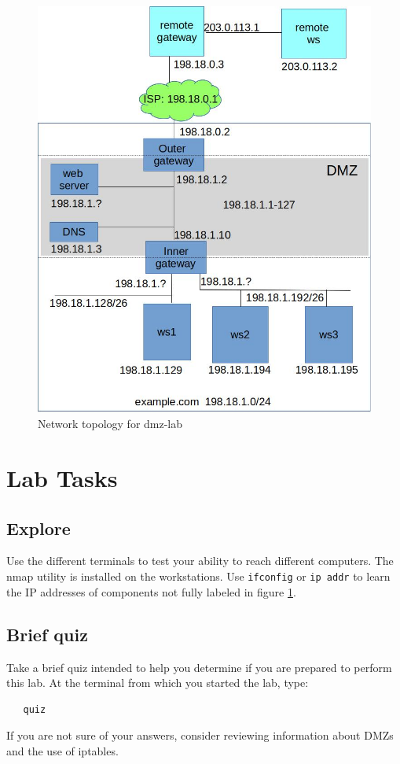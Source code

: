 \begin{figure}[H]
\begin{center}
\includegraphics [width=0.8\linewidth]{dmz-lab.jpg}
\end{center}
\caption{Network topology for dmz-lab}
\label{fig:topology}
\end{figure}

\section{Lab Tasks}
\subsection{Explore}
Use the different terminals to test your ability to reach different computers.
The nmap utility is installed on the workstations.  Use {\tt ifconfig} or {\tt ip addr} to
learn the IP addresses of components not fully labeled in figure \ref{fig:topology}.
\subsection{Brief quiz}
Take a brief quiz intended to help you determine if you are prepared to perform this lab.  At
the terminal from which you started the lab, type:
\begin{verbatim}
   quiz 
\end{verbatim}
\noindent If you are not sure of your answers, consider reviewing information about DMZs and
the use of iptables.

